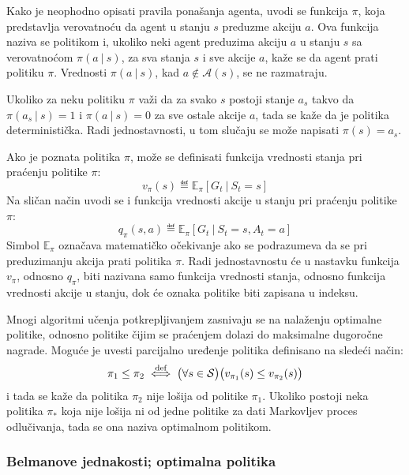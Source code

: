 Kako je neophodno opisati pravila ponašanja agenta, uvodi se funkcija $\pi$, koja predstavlja verovatnoću da agent u stanju $s$ preduzme akciju $a$. Ova funkcija naziva se politikom i, ukoliko neki agent preduzima akciju $a$ u stanju $s$ sa verovatnoćom $\pi(a~|~s)$, za sva stanja $s$ i sve akcije $a$, kaže se da agent prati politiku $\pi$. Vrednosti $\pi(a~|~s)$, kad $a \notin \mathcal{A}(s)$, se ne razmatraju.

Ukoliko za neku politiku $\pi$ važi da za svako $s$ postoji stanje $a_s$ takvo da $\pi(a_s~|~s)=1$ i $\pi(a~|~s)=0$ za sve ostale akcije $a$, tada se kaže da je politika deterministička. Radi jednostavnosti, u tom slučaju se može napisati $\pi(s)=a_s$.
\par 
Ako je poznata politika $\pi$, može se definisati funkcija vrednosti stanja pri praćenju politike $\pi$:
\begin{equation}
	v_{\pi}(s) \eqdef \mathbb{E}_{\pi}[G_t~|~S_t=s]
\end{equation}
Na sličan način uvodi se i funkcija vrednosti akcije u stanju pri praćenju politike $\pi$:
\begin{equation}
	q_{\pi}(s, a) \eqdef \mathbb{E}_{\pi}[G_t~|~S_t=s, A_t=a]
\end{equation}
Simbol $\mathbb{E}_{\pi}$ označava matematičko očekivanje ako se podrazumeva da se pri preduzimanju akcija prati politika $\pi$. Radi jednostavnostu će u nastavku funkcija $v_{\pi}$, odnosno $q_{\pi}$, biti nazivana samo funkcija vrednosti stanja, odnosno funkcija vrednosti akcije u stanju, dok će oznaka politike biti zapisana u indeksu.
\par 
Mnogi algoritmi učenja potkrepljivanjem zasnivaju se na nalaženju optimalne politike, odnosno politike čijim se praćenjem dolazi do maksimalne dugoročne nagrade. Moguće je uvesti parcijalno uređenje politika definisano na sledeći način:
\begin{equation}
	\label{eq:nije_losija}
	\pi_1 \leq \pi_2 \stackrel{\text{def}}{\iff} \big(\forall s \in \mathcal{S}\big) \big( v_{\pi_1}(s) \leq v_{\pi_2}(s)\big)
\end{equation}
i tada se kaže da politika $\pi_2$ nije lošija  od politike $\pi_1$. Ukoliko postoji neka politika $\pi_*$ koja nije lošija ni od jedne politike za dati Markovljev proces odlučivanja, tada se ona naziva optimalnom politikom. 

\subsubsection{Belmanove jednakosti; optimalna politika}

